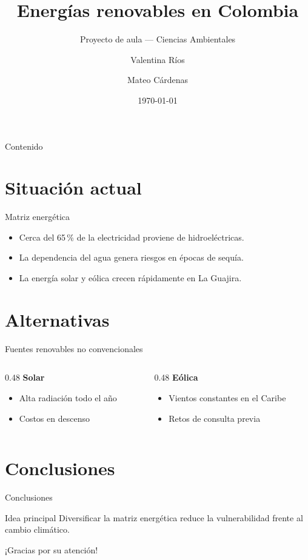 \documentclass{beamer}
\title{Energías renovables en Colombia}
\subtitle{Proyecto de aula --- Ciencias Ambientales}
\author{Valentina Ríos \and Mateo Cárdenas}
\institute{Colegio San Bartolomé}
\date{\today}
\begin{document}
\begin{frame}
  \titlepage
\end{frame}

\begin{frame}{Contenido}
  \tableofcontents
\end{frame}

\section{Situación actual}
\begin{frame}{Matriz energética}
  \begin{itemize}
    \item Cerca del 65\,\% de la electricidad proviene de hidroeléctricas.
    \item La dependencia del agua genera riesgos en épocas de sequía.
    \item La energía solar y eólica crecen rápidamente en La Guajira.
  \end{itemize}
\end{frame}

\section{Alternativas}
\begin{frame}{Fuentes renovables no convencionales}
  \begin{columns}[T]
    \begin{column}{0.48\textwidth}
      \textbf{Solar}
      \begin{itemize}
        \item Alta radiación todo el año
        \item Costos en descenso
      \end{itemize}
    \end{column}
    \begin{column}{0.48\textwidth}
      \textbf{Eólica}
      \begin{itemize}
        \item Vientos constantes en el Caribe
        \item Retos de consulta previa
      \end{itemize}
    \end{column}
  \end{columns}
\end{frame}

\section{Conclusiones}
\begin{frame}{Conclusiones}
  \begin{block}{Idea principal}
    Diversificar la matriz energética reduce la vulnerabilidad frente al cambio
    climático.
  \end{block}
  \pause
  ¡Gracias por su atención!
\end{frame}
\end{document}
